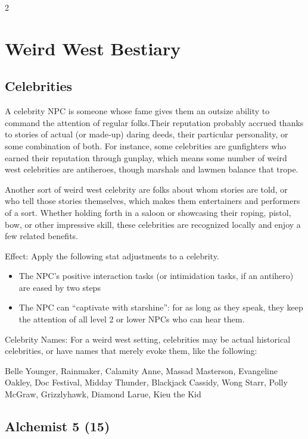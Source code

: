 \begin{multicols}{2}

\chapter{Weird West Bestiary}

\section{Celebrities}

A celebrity NPC is someone whose fame gives them an outsize ability to command the attention of regular folks.Their reputation probably accrued thanks to stories of actual (or made‑up) daring deeds, their particular personality, or some combination of both. For instance, some celebrities are gunfighters who earned their reputation through gunplay, which means some number of weird west celebrities are antiheroes, though marshals and lawmen balance that trope.

Another sort of weird west celebrity are folks about whom stories are told, or who tell those stories themselves, which makes them entertainers and performers of a sort. Whether holding forth in a saloon or showcasing their roping, pistol, bow, or other impressive skill, these celebrities are recognized locally and enjoy a few related benefits.

Effect: Apply the following stat adjustments to a celebrity.
\begin{itemize}
\item The NPC’s positive interaction tasks (or intimidation tasks, if an antihero) are eased by two steps
\item The NPC can “captivate with starshine”: for as long as they speak, they keep the attention of all level 2 or lower NPCs who can hear them.
\end{itemize}
Celebrity Names: For a weird west setting, celebrities may be actual historical celebrities, or have names that merely evoke them, like the following:

Belle Younger, Rainmaker, Calamity Anne, Massad Masterson, Evangeline Oakley, Doc Festival, Midday Thunder, Blackjack Cassidy, Wong Starr, Polly McGraw, Grizzlyhawk, Diamond Larue, Kieu the Kid

\section{Alchemist 5 (15)}


\end{multicols}
